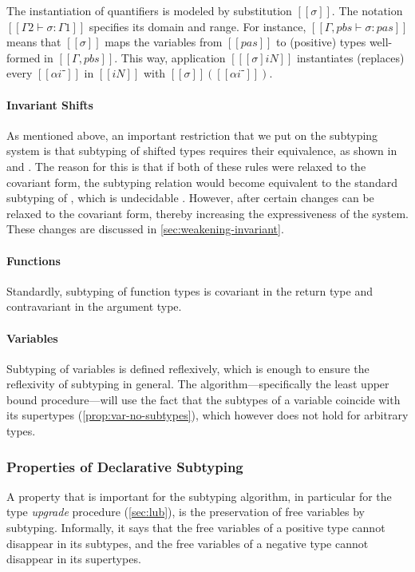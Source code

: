 The instantiation of quantifiers is modeled by substitution $[[σ]]$.
The notation $[[Γ2 ⊢ σ : Γ1]]$ specifies its domain and range.
For instance, $[[Γ, pbs ⊢ σ : {pas}]]$ means that 
$[[σ]]$ maps the variables from $[[pas]]$ to (positive) types
well-formed in $[[Γ, pbs]]$.
This way, application $[[ [σ]iN ]]$ instantiates (replaces) every
$[[αi⁻]]$ in $[[iN]]$ with $[[σ]]([[αi⁻]])$.

\paragraph{Invariant Shifts}
As mentioned above, an important restriction that we put on the subtyping system
is that subtyping of shifted types requires their equivalence, as shown in
 and . The
reason for this is that if both of these rules were relaxed to the covariant
form, the subtyping relation would become equivalent to the standard subtyping
of \systemf, which is undecidable \cite{tiuryn-urzczyn-96}. However, after
certain changes  can be relaxed to the
covariant form, thereby increasing the expressiveness of the system. These
changes are discussed in \cref{sec:weakening-invariant}.

\paragraph{Functions}
Standardly, subtyping of function types is covariant in the return type
and contravariant in the argument type.

\paragraph{Variables}
Subtyping of variables is defined reflexively, which is enough to ensure the
reflexivity of subtyping in general. The algorithm---specifically the least
upper bound procedure---will use the fact that the subtypes of a variable
coincide with its supertypes (\cref{prop:var-no-subtypes}),
which however does not hold for arbitrary types.

\subsubsection{Properties of Declarative Subtyping}
\label{sec:decl-subtyping-properties}

A property that is important for the subtyping algorithm, 
in particular for the type \emph{upgrade} procedure (\cref{sec:lub}),
is the preservation of free variables by subtyping.
Informally, it says that the free variables
of a positive type cannot disappear in its subtypes,
and the free variables of a negative type
cannot disappear in its supertypes.

